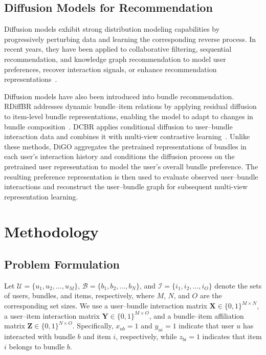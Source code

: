 \documentclass[letterpaper]{article}
\begin{document}
\subsection{Diffusion Models for Recommendation}

Diffusion models exhibit strong distribution modeling
capabilities by progressively perturbing data and learning the
corresponding reverse process. In recent years, they have been
applied to collaborative filtering, sequential recommendation,
and knowledge graph recommendation to model user preferences,
recover interaction signals, or enhance recommendation
representations~\cite{diffrec,diffurec,diffkg}.

Diffusion models have also been introduced into bundle
recommendation. RDiffBR addresses dynamic bundle--item relations
by applying residual diffusion to item-level bundle
representations, enabling the model to adapt to changes in bundle
composition~\cite{rdiffbr}. DCBR applies conditional diffusion to
user--bundle interaction data and combines it with multi-view
contrastive learning~\cite{dcbr}. Unlike these methods, DiGO
aggregates the pretrained representations of bundles in each
user's interaction history and conditions the diffusion process
on the pretrained user representation to model the user's overall
bundle preference. The resulting preference representation is
then used to evaluate observed user--bundle interactions and
reconstruct the user--bundle graph for subsequent multi-view
representation learning.



\section{Methodology}

\subsection{Problem Formulation}

Let
$\mathcal U=\{u_1,u_2,\ldots,u_M\}$,
$\mathcal B=\{b_1,b_2,\ldots,b_N\}$, and
$\mathcal I=\{i_1,i_2,\ldots,i_O\}$
denote the sets of users, bundles, and items, respectively, where
$M$, $N$, and $O$ are the corresponding set sizes. We use a
user--bundle interaction matrix
$\mathbf X\in\{0,1\}^{M\times N}$, a user--item interaction
matrix $\mathbf Y\in\{0,1\}^{M\times O}$, and a bundle--item
affiliation matrix $\mathbf Z\in\{0,1\}^{N\times O}$.
Specifically, $x_{ub}=1$ and $y_{ui}=1$ indicate that user $u$
has interacted with bundle $b$ and item $i$, respectively, while
$z_{bi}=1$ indicates that item $i$ belongs to bundle $b$.
\end{document}
